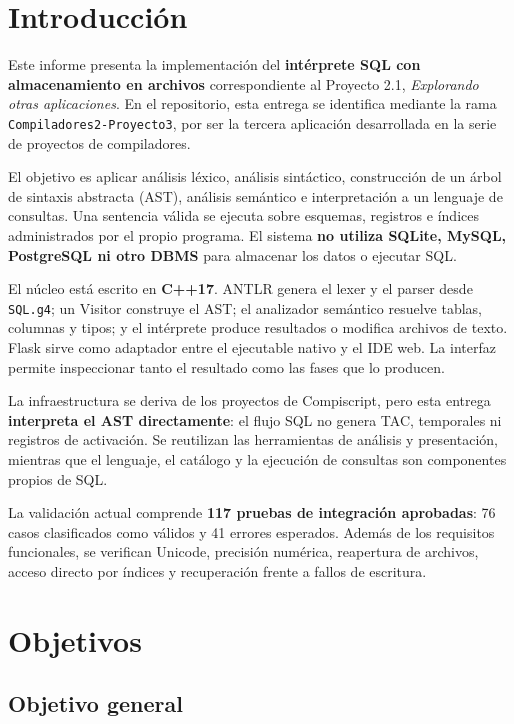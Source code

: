 \documentclass[11pt,a4paper]{article}
\begin{document}
\section{Introducción}

Este informe presenta la implementación del \textbf{intérprete SQL con
almacenamiento en archivos} correspondiente al Proyecto 2.1, \emph{Explorando
otras aplicaciones}. En el repositorio, esta entrega se identifica mediante
la rama \texttt{Compiladores2-Proyecto3}, por ser la tercera aplicación
desarrollada en la serie de proyectos de compiladores.

El objetivo es aplicar análisis léxico, análisis sintáctico, construcción de
un árbol de sintaxis abstracta (AST), análisis semántico e interpretación a
un lenguaje de consultas. Una sentencia válida se ejecuta sobre esquemas,
registros e índices administrados por el propio programa. El sistema
\textbf{no utiliza SQLite, MySQL, PostgreSQL ni otro DBMS} para almacenar los
datos o ejecutar SQL.

El núcleo está escrito en \textbf{C++17}. ANTLR genera el lexer y el parser
desde \texttt{SQL.g4}; un Visitor construye el AST; el analizador semántico
resuelve tablas, columnas y tipos; y el intérprete produce resultados o
modifica archivos de texto. Flask sirve como adaptador entre el ejecutable
nativo y el IDE web. La interfaz permite inspeccionar tanto el resultado
como las fases que lo producen.

La infraestructura se deriva de los proyectos de Compiscript, pero esta
entrega \textbf{interpreta el AST directamente}: el flujo SQL no genera TAC,
temporales ni registros de activación. Se reutilizan las herramientas de
análisis y presentación, mientras que el lenguaje, el catálogo y la
ejecución de consultas son componentes propios de SQL.

La validación actual comprende \textbf{117 pruebas de integración aprobadas}:
76 casos clasificados como válidos y 41 errores esperados. Además de los
requisitos funcionales, se verifican Unicode, precisión numérica,
reapertura de archivos, acceso directo por índices y recuperación frente a
fallos de escritura.

\section{Objetivos}
\subsection{Objetivo general}
\end{document}
